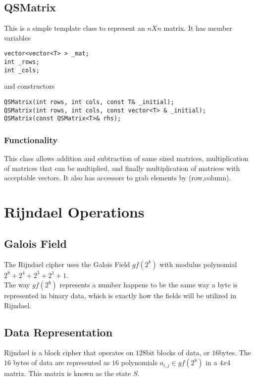 \documentclass{article}
\begin{document}
\subsection{QSMatrix}

This is a simple template class to represent an $nXn$ matrix.  It has member variables
\begin{lstlisting}
vector<vector<T> > _mat;
int _rows;
int _cols;
\end{lstlisting}
and constructors
\begin{lstlisting}
QSMatrix(int rows, int cols, const T& _initial);
QSMatrix(int rows, int cols, const vector<T> & _initial);
QSMatrix(const QSMatrix<T>& rhs);
\end{lstlisting}

\subsubsection{Functionality}

This class allows addition and subtraction of same sized matrices, multiplication of matrices that can be multiplied, and finally multiplication of matrices with acceptable vectors.  It also has accessors to grab elements by (row,column).

\section{Rijndael Operations}

\subsection{Galois Field}

The Rijndael cipher uses the Galois Field $gf(2^8)$ with modulus polynomial $2^8+2^4+2^3+2^1+1$.\\
The way $gf(2^8)$ represents a number happens to be the same way a byte is represented in binary data, which is exactly how the fields will be utilized in Rijndael.

\subsection{Data Representation}

Rijndael is a block cipher that operates on $128$bit blocks of data, or $16$bytes.  The $16$ bytes of data are represented as $16$ polynomials $a_{i,j}\in gf(2^8)$ in a $4x4$ matrix.  This matrix is known as the state $S$.\\
\end{document}
